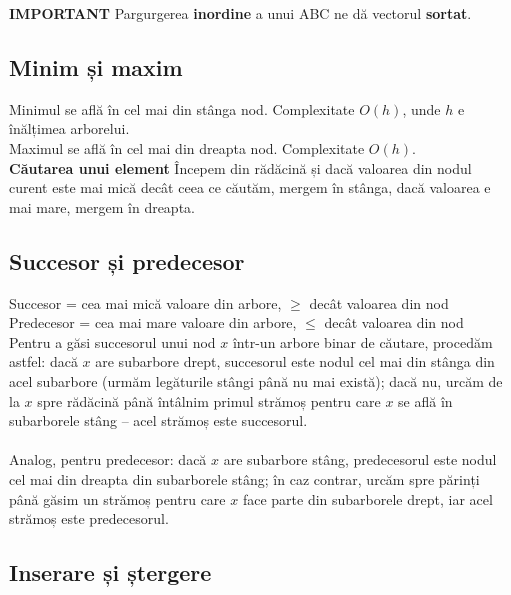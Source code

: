 \documentclass[11pt,a4paper]{article}
\theoremstyle{definition}
\theoremstyle{plain}
\theoremstyle{remark}
\begin{document}
\noindent\textbf{IMPORTANT} Pargurgerea \textbf{inordine} a unui ABC ne dă vectorul \textbf{sortat}.

\subsection{Minim și maxim}
Minimul se află în cel mai din stânga nod. Complexitate $O(h)$,  unde $h$ e înălțimea arborelui.\\

\noindent Maximul se află în cel mai din dreapta nod. Complexitate $O(h)$.\\

\noindent\textbf{Căutarea unui element}
Începem din rădăcină și dacă valoarea din nodul curent este mai mică decât ceea
ce căutăm, mergem în stânga, dacă valoarea e mai mare, mergem în dreapta.

\subsection{Succesor și predecesor}

Succesor = cea mai mică valoare din arbore, $\ge$ decât valoarea din nod\\
Predecesor = cea mai mare valoare din arbore, $\le$ decât valoarea din nod\\

 Pentru a găsi succesorul unui nod \(x\) într-un arbore binar de căutare, procedăm astfel: dacă \(x\) are subarbore drept, succesorul este nodul cel mai din stânga din acel subarbore (urmăm legăturile stângi până nu mai există); dacă nu, urcăm de la \(x\) spre rădăcină până întâlnim primul strămoș pentru care \(x\) se află în subarborele stâng – acel strămoș este succesorul.\\\\

Analog, pentru predecesor: dacă \(x\) are subarbore stâng, predecesorul este nodul cel mai din dreapta din subarborele stâng; în caz contrar, urcăm spre părinți până găsim un strămoș pentru care \(x\) face parte din subarborele drept, iar acel strămoș este predecesorul.

\subsection{Inserare și ștergere}
\end{document}
